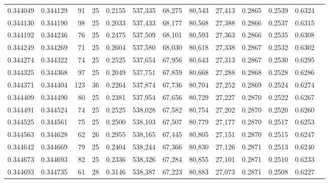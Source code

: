 \begin{tabular}{rrrrrrrrrrrrr}
0.344049 & 0.344129 &    91 &  25 &                                     0.2155 & 537,335 &  68,275 &  80,543 &  27,413 & 0.2865 & 0.2539 & 0.6324 \\
0.344130 & 0.344190 &    98 &  25 &                                     0.2033 & 537,433 &  68,177 &  80,568 &  27,388 & 0.2866 & 0.2537 & 0.6315 \\
0.344192 & 0.344246 &    76 &  25 &                                     0.2475 & 537,509 &  68,101 &  80,593 &  27,363 & 0.2866 & 0.2535 & 0.6308 \\
0.344249 & 0.344269 &    71 &  25 &                                     0.2604 & 537,580 &  68,030 &  80,618 &  27,338 & 0.2867 & 0.2532 & 0.6302 \\
0.344274 & 0.344322 &    74 &  25 &                                     0.2525 & 537,654 &  67,956 &  80,643 &  27,313 & 0.2867 & 0.2530 & 0.6295 \\
0.344325 & 0.344368 &    97 &  25 &                                     0.2049 & 537,751 &  67,859 &  80,668 &  27,288 & 0.2868 & 0.2528 & 0.6286 \\
0.344371 & 0.344404 &   123 &  36 &                                     0.2264 & 537,874 &  67,736 &  80,704 &  27,252 & 0.2869 & 0.2524 & 0.6274 \\
0.344409 & 0.344490 &    80 &  25 &                                     0.2381 & 537,954 &  67,656 &  80,729 &  27,227 & 0.2870 & 0.2522 & 0.6267 \\
0.344491 & 0.344524 &    74 &  25 &                                     0.2525 & 538,028 &  67,582 &  80,754 &  27,202 & 0.2870 & 0.2520 & 0.6260 \\
0.344525 & 0.344561 &    75 &  25 &                                     0.2500 & 538,103 &  67,507 &  80,779 &  27,177 & 0.2870 & 0.2517 & 0.6253 \\
0.344563 & 0.344628 &    62 &  26 &                                     0.2955 & 538,165 &  67,445 &  80,805 &  27,151 & 0.2870 & 0.2515 & 0.6247 \\
0.344642 & 0.344669 &    79 &  25 &                                     0.2404 & 538,244 &  67,366 &  80,830 &  27,126 & 0.2871 & 0.2513 & 0.6240 \\
0.344673 & 0.344693 &    82 &  25 &                                     0.2336 & 538,326 &  67,284 &  80,855 &  27,101 & 0.2871 & 0.2510 & 0.6233 \\
0.344693 & 0.344735 &    61 &  28 &                                     0.3146 & 538,387 &  67,223 &  80,883 &  27,073 & 0.2871 & 0.2508 & 0.6227 \\

\end{tabular}
